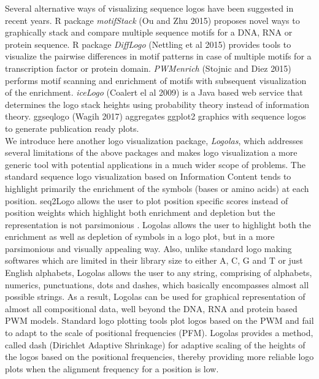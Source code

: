 \documentclass{bmcart}
\begin{document}
Several alternative ways of visualizing sequence logos have been suggested in recent years. R package \textit{motifStack} (Ou and Zhu 2015) \cite{Ou2015} proposes novel ways to graphically stack and compare multiple sequence motifs for a DNA, RNA or protein sequence.  R package \textit{DiffLogo} (Nettling et al 2015) \cite{Nettling2015} provides tools to visualize the pairwise differences in motif patterns in case of multiple motifs for a transcription factor or protein domain. \textit{PWMenrich} (Stojnic and Diez 2015) \cite{Stojnic2015} performs motif scanning and enrichment of motifs with subsequent visualization of the enrichment. \textit{iceLogo} (Coalert el al 2009) \cite{Coalert2009} is a Java based web service that determines the logo stack heights using probability theory instead of information theory. ggseqlogo (Wagih 2017) \cite{Wagih2017} aggregates ggplot2 graphics with sequence logos to generate publication ready plots. \\[3 pt]

We introduce here another logo visualization package, \textit{Logolas}, which addresses several limitations of the above packages and makes logo visualization a more generic tool with potential applications in a much wider scope of problems. The standard sequence logo visualization based on Information Content tends to highlight primarily the enrichment of the symbols (bases or amino acids) at each position. seq2Logo allows the user to plot position specific scores instead of position weights which highlight both enrichment and depletion but the representation is not parsimonious \cite{Thomsen2012}. Logolas allows the user to highlight both the enrichment as well as depletion of symbols in a logo plot, but in a more parsimonious and visually appealing way. Also, unlike standard logo making softwares which are limited in their library size to either A, C, G and T or just English alphabets, Logolas allows the user to any string, comprising of alphabets, numerics, punctuations, dots and dashes, which basically encompasses almost all possible strings. As a result, Logolas can be used for graphical representation of almost all compositional data, well beyond the DNA, RNA and protein based PWM models. Standard logo plotting tools plot logos based on the PWM and fail to adapt to the scale of positional frequencies (PFM). Logolas provides a method, called dash (Dirichlet Adaptive Shrinkage) for adaptive scaling of the heights of the logos based on the positional frequencies, thereby providing more reliable logo plots when the alignment frequency for a position is low.
\end{document}
